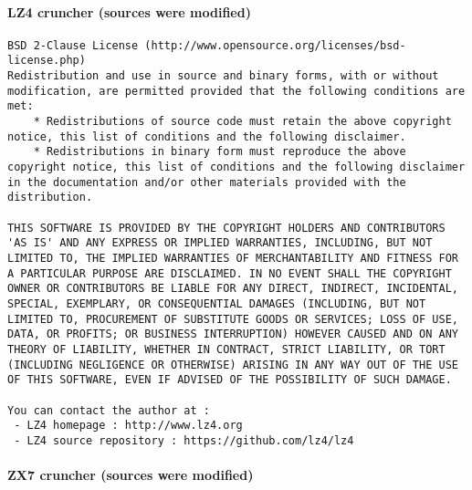 \paragraph{LZ4 cruncher (sources were modified)}
\begin{verbatim}
BSD 2-Clause License (http://www.opensource.org/licenses/bsd-license.php)
Redistribution and use in source and binary forms, with or without
modification, are permitted provided that the following conditions are
met:
    * Redistributions of source code must retain the above copyright
notice, this list of conditions and the following disclaimer.
    * Redistributions in binary form must reproduce the above
copyright notice, this list of conditions and the following disclaimer
in the documentation and/or other materials provided with the
distribution.

THIS SOFTWARE IS PROVIDED BY THE COPYRIGHT HOLDERS AND CONTRIBUTORS
'AS IS' AND ANY EXPRESS OR IMPLIED WARRANTIES, INCLUDING, BUT NOT
LIMITED TO, THE IMPLIED WARRANTIES OF MERCHANTABILITY AND FITNESS FOR
A PARTICULAR PURPOSE ARE DISCLAIMED. IN NO EVENT SHALL THE COPYRIGHT
OWNER OR CONTRIBUTORS BE LIABLE FOR ANY DIRECT, INDIRECT, INCIDENTAL,
SPECIAL, EXEMPLARY, OR CONSEQUENTIAL DAMAGES (INCLUDING, BUT NOT
LIMITED TO, PROCUREMENT OF SUBSTITUTE GOODS OR SERVICES; LOSS OF USE,
DATA, OR PROFITS; OR BUSINESS INTERRUPTION) HOWEVER CAUSED AND ON ANY
THEORY OF LIABILITY, WHETHER IN CONTRACT, STRICT LIABILITY, OR TORT
(INCLUDING NEGLIGENCE OR OTHERWISE) ARISING IN ANY WAY OUT OF THE USE
OF THIS SOFTWARE, EVEN IF ADVISED OF THE POSSIBILITY OF SUCH DAMAGE.

You can contact the author at :
 - LZ4 homepage : http://www.lz4.org
 - LZ4 source repository : https://github.com/lz4/lz4
\end{verbatim}

\pagebreak
\paragraph{ZX7 cruncher (sources were modified)}

